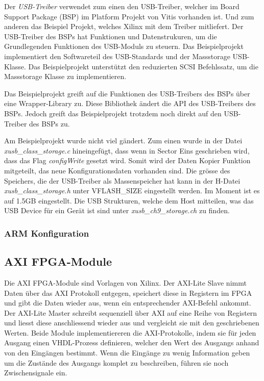 \documentclass{article}
\begin{document}
Der \textit{USB-Treiber} verwendet zum einen den USB-Treiber, welcher im Board Support Package (BSP) im Platform Projekt von Vitis vorhanden ist. Und zum anderen das Beispiel Projekt, welches Xilinx mit dem Treiber mitliefert. Der USB-Treiber des BSPs hat Funktionen und Datenstrukuren, um die Grundlegenden Funktionen des USB-Moduls zu steuern. Das Beispielprojekt implementiert den Softwareteil des USB-Standards und der Massstorage USB-Klasse. Das Beispielprojekt unterstützt den reduzierten SCSI Befehlssatz, um die Massstorage Klasse zu implementieren.

Das Beispielprojekt greift auf die Funktionen des USB-Treibers des BSPs über eine Wrapper-Library zu. Diese Bibliothek ändert die API des USB-Treibers des BSPs. Jedoch greift das Beispielprojekt trotzdem noch direkt auf den USB-Treiber des BSPs zu. 

Am Beispielprojekt wurde nicht viel gändert. Zum einen wurde in der Datei \textit{xusb\_class\_storage.c} hineingefügt, dass wenn in Sector Eins geschrieben wird, dass das Flag \textit{configWrite} gesetzt wird. Somit wird der Daten Kopier Funktion mitgeteilt, das neue Konfigurationsdaten vorhanden sind. Die grösse des Speichers, die der USB-Treiber als Massenspeicher hat kann in der H-Datei \textit{xusb\_class\_storage.h} unter VFLASH\_SIZE eingestellt werden. Im Moment ist es auf 1.5GB eingestellt.
Die USB Strukturen, welche dem Host mitteilen, was das USB Device für ein Gerät ist sind unter \textit{xusb\_ch9\_storage.ch} zu finden.
\subsubsection*{ARM Konfiguration}

\subsection{AXI FPGA-Module}
\label{sec:axi}
Die AXI FPGA-Module sind Vorlagen von Xilinx. Der AXI-Lite Slave nimmt Daten über das AXI Protokoll entgegen, speichert diese in Registern im FPGA und gibt die Daten wieder aus, wenn ein entsprechender AXI-Befehl ankommt. Der AXI-Lite Master schreibt sequenziell über AXI auf eine Reihe von Registern und liesst diese anschliessend wieder aus und vergleicht sie mit den geschriebenen Werten. Beide Module implementiereren die AXI-Protokolle, indem sie für jeden Ausgang einen VHDL-Prozess definieren, welcher den Wert des Ausgangs anhand von den Eingängen bestimmt. Wenn die Eingänge zu wenig Information geben um die Zustände des Ausgangs komplet zu beschreiben, führen sie noch Zwischensignale ein.
\end{document}
